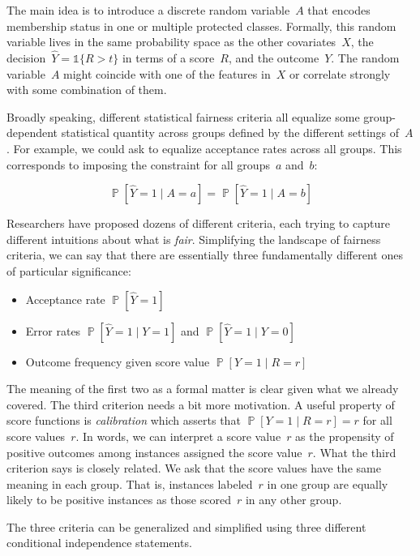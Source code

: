 \documentclass{tufte-book}
\begin{document}
The main idea is to introduce a discrete random variable~\(A\) that
encodes membership status in one or multiple protected classes.
Formally, this random variable lives in the same probability space as
the other covariates~\(X\), the decision~\(\hat Y=\mathbb{1}\{ R > t\}\)
in terms of a score~\(R\), and the outcome~\(Y\). The random
variable~\(A\) might coincide with one of the features in~\(X\) or
correlate strongly with some combination of them.

Broadly speaking, different statistical fairness criteria all equalize
some group-dependent statistical quantity across groups defined by the
different settings of~\(A\). For example, we could ask to equalize
acceptance rates across all groups. This corresponds to imposing the
constraint for all groups~\(a\) and~\(b\):

\[
\mathop\mathbb{P}[\hat Y = 1 \mid A=a] = \mathop\mathbb{P}[\hat Y = 1 \mid A=b]
\]

Researchers have proposed dozens of different criteria, each trying to
capture different intuitions about what is \emph{fair}. Simplifying the
landscape of fairness criteria, we can say that there are essentially
three fundamentally different ones of particular significance:

\begin{itemize}
\tightlist
\item
  Acceptance rate \(\mathop\mathbb{P}[\hat Y = 1]\)
\item
  Error rates \(\mathop\mathbb{P}[\hat Y = 1 \mid Y = 1]\) and
  \(\mathop\mathbb{P}[\hat Y = 1 \mid Y =0]\)
\item
  Outcome frequency given score value
  \(\mathop\mathbb{P}[Y = 1 \mid R = r ]\)
\end{itemize}

The meaning of the first two as a formal matter is clear given what we
already covered. The third criterion needs a bit more motivation. A
useful property of score functions is \emph{calibration} which asserts
that \(\mathop\mathbb{P}[Y = 1\mid R=r]=r\) for all score values~\(r\).
In words, we can interpret a score value~\(r\) as the propensity of
positive outcomes among instances assigned the score value~\(r\). What
the third criterion says is closely related. We ask that the score
values have the same meaning in each group. That is, instances
labeled~\(r\) in one group are equally likely to be positive instances
as those scored~\(r\) in any other group.

The three criteria can be generalized and simplified using three
different conditional independence statements.
\end{document}
